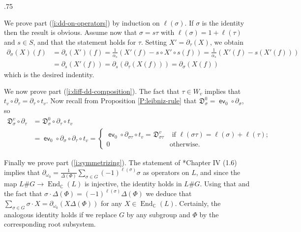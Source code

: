 \documentclass[11pt,fleqn]{amsart}
\makeatletter
\renewcommand\proofname{Proof}
\renewenvironment{proof}[1][\textit{\proofname}]{\par
 \pushQED{\qed}%
 \normalfont \topsep.75\paraskip\relax
 \trivlist
 \item[\hskip\labelsep
 \itshape
 #1\@addpunct{.}]\ignorespaces
}{%
 \popQED\endtrivlist\@endpefalse
}
\newcounter{para}[section]
\newcommand\CC{\mathbb C}
\renewcommand\to{\longrightarrow}
\newcommand\D[3]{{}^{#1} \mathfrak D_{#2}^{#3}}
\DeclareMathOperator\End{End}
\DeclareMathOperator\ev{\mathsf{ev}}
\makeatother
\begin{document}
\begin{proof}
We prove part (\ref{i:dd-on-operators}) by induction on $\ell(\sigma)$. If 
$\sigma$ is the identity then the result is obvious. Assume now that $\sigma 
= s \tau$ with $\ell(\sigma) = 1 + \ell(\tau)$ and $s \in S$, and that the 
statement holds for $\tau$. Setting $X' = 
\partial_\tau(X)$, we obtain
\begin{align*}
\partial_\sigma(X) (f)
	&= \partial_s(X')(f)
	= \frac{1}{\alpha_s} (X'(f) - s\circ X' \circ s (f)) 
	= \frac{1}{\alpha_s} (X'(f) - s(X'(f)))\\
	&= \partial_s(X'(f))
	= \partial_s(\partial_\tau(X(f)))
	= \partial_\sigma(X(f))
\end{align*} 
which is the desired indentity.

We now prove part (\ref{i:diff-dd-composition}). The fact that $\tau \in W_v$
implies that $t_v \circ \partial_\tau = \partial_\tau \circ t_v$. Now recall
from Proposition \ref{P:leibniz-rule} that $\D{}{\sigma}{0} = \ev_0 \circ 
\partial_\sigma$, so 
\begin{align*}
\D{}{\sigma}{v} \circ \partial_\tau 
	&= \D{}{\sigma}{0} \circ \partial_\tau \circ t_v \\
	&= \ev_0 \circ \partial_\sigma \circ \partial_\tau \circ t_v
	= \begin{cases}
		\ev_0 \circ \partial_{\sigma\tau} \circ t_v = \D{}{\sigma\tau}{v}
			& \mbox{ if } \ell(\sigma \tau) = \ell(\sigma) + \ell(\tau); \\
		0 & \mbox{otherwise}.
	\end{cases}
\end{align*}

Finally we prove part (\ref{i:symmetrizing}).
The statement of \cite{Hiller-coxeter-book}*{Chapter IV (1.6)} implies that
$\partial_{\omega_0} = \frac{1}{\Delta(\Phi)} \sum_{\sigma \in G} 
(-1)^{\ell(\sigma)} \sigma$ as operators on $L$, and since the map $L \# 
G \to \End_\CC(L)$ is injective, the identity holds in $L \# G$. Using that and the 
fact that $\sigma \cdot \Delta(\Phi) = (-1)^{\ell(\sigma)} \Delta(\Phi)$ we 
deduce that $\sum_{\sigma \in G} \sigma \cdot X = \partial_{\omega_0}
(X \Delta(\Phi))$ for any $X \in \End_\CC(L)$. Certainly, the analogous identity 
holds if we replace $G$ by any subgroup and $\Phi$ by the corresponding root 
subsystem.


\end{proof}
\end{document}
